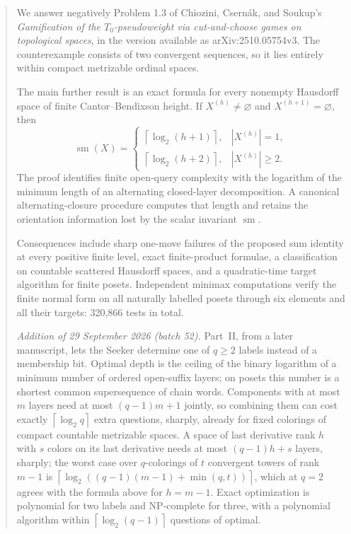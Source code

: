 \documentclass[11pt,letterpaper]{article}
\numberwithin{equation}{section}
\theoremstyle{definition}
\theoremstyle{remark}
\theoremstyle{definition}
\newcommand{\sm}{\operatorname{sm}}
\newcommand{\ceil}[1]{\left\lceil#1\right\rceil}
\begin{document}
\begin{abstract}
We answer negatively Problem 1.3 of Chiozini, Csern\'ak, and Soukup's
\emph{Gamification of the $T_0$-pseudoweight via cut-and-choose games on
topological spaces}, in the version available as arXiv:2510.05754v3.
The counterexample consists of two convergent sequences, so it lies entirely
within compact metrizable ordinal spaces.

The main further result is an exact formula for every nonempty Hausdorff space
of finite Cantor--Bendixson height. If $X^{(h)}\ne\varnothing$ and
$X^{(h+1)}=\varnothing$, then
\[
 \sm(X)=
 \begin{cases}
  \ceil{\log_2(h+1)},& |X^{(h)}|=1,\\
  \ceil{\log_2(h+2)},& |X^{(h)}|\geq2.
 \end{cases}
\]
The proof identifies finite open-query complexity with the logarithm of the
minimum length of an alternating closed-layer decomposition. A canonical
alternating-closure procedure computes that length and retains the orientation
information lost by the scalar invariant $\sm$.

Consequences include sharp one-move failures of the proposed sum identity at
every positive finite level, exact finite-product formulae, a classification on
countable scattered Hausdorff spaces, and a quadratic-time target algorithm for
finite posets. Independent minimax computations verify the finite normal form
on all naturally labelled posets through six elements and all their targets:
320,866 tests in total.

\emph{Addition of 29 September 2026 (batch 52).} Part~II, from a later
manuscript, lets the Seeker determine one of $q\ge2$ labels instead of a
membership bit. Optimal depth is the ceiling of the binary logarithm of a
minimum number of ordered open-suffix layers; on posets this number is a shortest common supersequence of
chain words. Components with at most $m$ layers need at most $(q-1)m+1$ jointly,
so combining them can cost exactly $\ceil{\log_2q}$ extra questions, sharply,
already for fixed colorings of compact countable metrizable spaces. A space of
last derivative rank $h$ with $s$ colors on its last derivative needs at most
$(q-1)h+s$ layers, sharply; the worst case over $q$-colorings of $t$ convergent
towers of rank $m-1$ is $\ceil{\log_2((q-1)(m-1)+\min(q,t))}$, which at $q=2$
agrees with the formula above for $h=m-1$. Exact optimization is polynomial for two labels and
NP-complete for three, with a polynomial algorithm within
$\ceil{\log_2(q-1)}$ questions of optimal.


\end{abstract}
\end{document}
